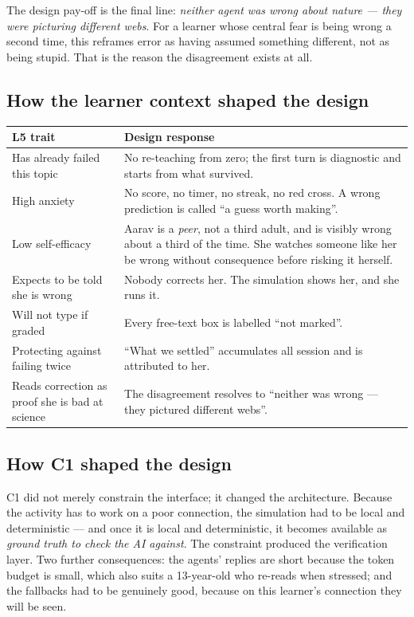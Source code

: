 \documentclass[11pt,a4paper]{article}
\begin{document}
The design pay-off is the final line: \emph{neither agent was wrong about nature --- they were
picturing different webs}. For a learner whose central fear is being wrong a second time, this
reframes error as having assumed something different, not as being stupid. That is the reason the
disagreement exists at all.

\subsection*{How the learner context shaped the design}

\begin{longtable}{@{}p{5.6cm}p{10.0cm}@{}}
\toprule
\textbf{L5 trait} & \textbf{Design response}\\
\midrule
\endhead
Has already failed this topic & No re-teaching from zero; the first turn is diagnostic and starts
from what survived.\\
High anxiety & No score, no timer, no streak, no red cross. A wrong prediction is called ``a guess
worth making''.\\
Low self-efficacy & Aarav is a \emph{peer}, not a third adult, and is visibly wrong about a third
of the time. She watches someone like her be wrong without consequence before risking it
herself.\\
Expects to be told she is wrong & Nobody corrects her. The simulation shows her, and she runs
it.\\
Will not type if graded & Every free-text box is labelled ``not marked''.\\
Protecting against failing twice & ``What we settled'' accumulates all session and is attributed
to her.\\
Reads correction as proof she is bad at science & The disagreement resolves to ``neither was
wrong --- they pictured different webs''.\\
\bottomrule
\end{longtable}

\subsection*{How C1 shaped the design}

C1 did not merely constrain the interface; it changed the architecture. Because the activity has
to work on a poor connection, the simulation had to be local and deterministic --- and once it
is local and deterministic, it becomes available as \emph{ground truth to check the AI against}.
The constraint produced the verification layer. Two further consequences: the agents' replies are
short because the token budget is small, which also suits a 13-year-old who re-reads when
stressed; and the fallbacks had to be genuinely good, because on this learner's connection they
will be seen.
\end{document}
